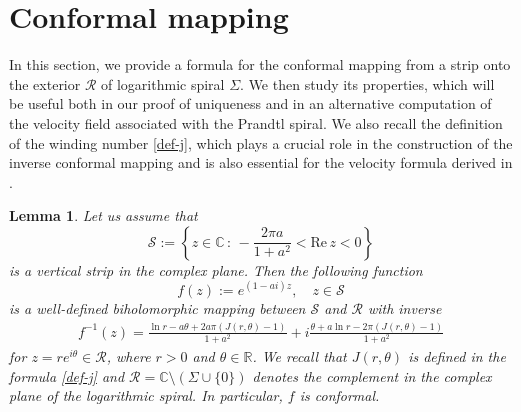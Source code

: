 \documentclass[11pt, letterpaper, reqno]{amsart}
\numberwithin{equation}{section}
\theoremstyle{definition}
\theoremstyle{plain}
\newtheorem{lem}[defi]{Lemma}
\numberwithin{equation}{section}
\def\C{\mathbb{C}}
\def\RR{\mathcal{R}}
\def\SS{\mathcal{S}}
\renewcommand{\r}{\mathbb{R}}
\begin{document}
\section{Conformal mapping}\label{przeksztalcenie}
In this section, we provide a formula for the conformal mapping from a strip onto the exterior $\RR$ of logarithmic spiral $\Sigma$. We then study its properties, which will be useful both in our proof of uniqueness and in an alternative computation of the velocity field associated with the Prandtl spiral. We also recall the definition of the winding number \eqref{def-j}, which plays a crucial role in the construction of the inverse conformal mapping and is also essential for the velocity formula derived in \cite{CKO}.
\begin{lem}\label{mapping}
Let us assume that 
\[
\SS:=\left\{z\in\C \,:\,  -\frac{2\pi a}{1+a^2}<\mathrm{Re}\,z<0\right\}
\]
is a vertical strip in the complex plane. Then the following function 
\begin{equation*}
f(z):=e^{(1-ai)z}, \quad z\in \SS
\end{equation*}
is a well-defined biholomorphic mapping between $\SS$ and $\RR$ with inverse
\begin{align*}
f^{-1}(z) = \frac{\ln r - a\theta + 2a\pi(J(r,\theta) - 1)}{1 + a^{2}} + i\frac{\theta + a\ln r - 2\pi(J(r,\theta) - 1) }{1 + a^{2}}
\end{align*}
for $z= re^{i\theta}\in \RR$, where $r>0$ and $\theta\in \r$. We recall that $J(r,\theta)$ is defined in the formula \eqref{def-j} and 
$\RR=\C\setminus(\Sigma\cup\{0\})$ denotes the complement in the complex plane of the logarithmic spiral. In particular, $f$ is conformal.
\end{lem}
\end{document}

